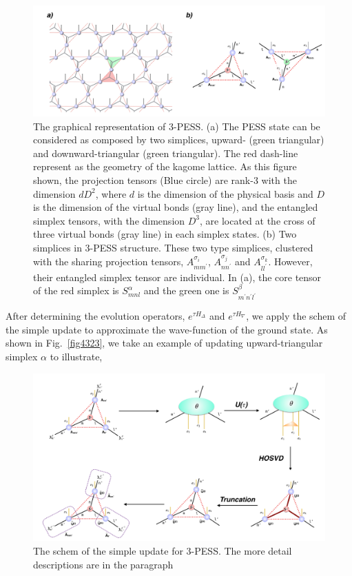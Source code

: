 \begin{figure}[ht]
	\centering
	\includegraphics[width=1.00\textwidth]{figures/fig4321.png}
	\caption[The graphical representation of 3-PESS]{The graphical representation of 3-PESS. (a) The PESS state can be considered as composed by two simplices, upward- (green triangular) and downward-triangular (green triangular). The red dash-line represent as the geometry of the kagome lattice. As this figure shown, the projection tensors (Blue circle) are rank-3 with the dimension $dD^2$, where $d$ is the dimension of the physical basis and $D$ is the dimension of the virtual bonds (gray line), and the entangled simplex tensors, with the dimension $D^3$, are located at the cross of three virtual bonds (gray line) in each simplex states. (b) Two simplices in 3-PESS structure. These two type simplices, clustered with the sharing projection tensors, $A^{\sigma_i}_{mm^{\prime}}$, $A^{\sigma_j}_{nn^{\prime}}$ and $A^{\sigma_k}_{ll^{\prime}}$. However, their entangled simplex tensor are individual. In (a), the core tensor of the red simplex is $S^{\alpha}_{mnl}$ and the green one is $S^{\beta}_{m^{\prime}n^{\prime}l^{\prime}}$}
	\label{fig4321}
\end{figure}

After determining the evolution operators, $e^{\tau H_{\Delta}}$ and $e^{\tau H_{\nabla}}$, we apply the schem of the simple update to approximate the wave-function of the ground state. As shown in Fig.~\ref{fig4323}, we take an example of updating upward-triangular simplex $\alpha$ to illustrate,

\begin{figure}[ht]
	\centering
	\includegraphics[width=1.00\textwidth]{figures/fig4322.png}
	\caption[The schem of the simple update for 3-PESS.]{The schem of the simple update for 3-PESS. The more detail descriptions are in the paragraph}
	\label{fig4322}
\end{figure}

